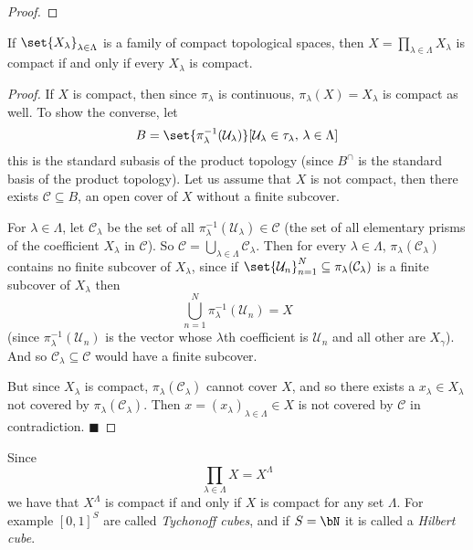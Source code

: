 \documentclass[10pt]{article}
\def\qed{\hskip1cm\penalty-100\hbox{}\hfill$\blacksquare$}
\def\mU{\mathcal{U}}
\def\mC{\mathcal{C}}
\begin{document}
\begin{proof}
\end{proof}

\begin{thrm*}

    If $\set{X_\lambda}_{\lambda\in\Lambda}$ is a family of compact topological spaces, then $X=\prod_{\lambda\in\Lambda}X_\lambda$ is compact if and only if every $X_\lambda$ is compact.

\end{thrm*}

\begin{proof}

    If $X$ is compact, then since $\pi_\lambda$ is continuous, $\pi_\lambda(X)=X_\lambda$ is compact as well.
    To show the converse, let
    \[ B = \set{\pi_\lambda^{-1}(\mU_\lambda)}[\mU_\lambda\in\tau_\lambda,\,\lambda\in\Lambda] \]
    this is the standard subasis of the product topology (since $B^\cap$ is the standard basis of the product topology).
    Let us assume that $X$ is not compact, then there exists $\mC\subseteq B$, an open cover of $X$ without a finite subcover.

    For $\lambda\in\Lambda$, let $\mC_\lambda$ be the set of all $\pi_\lambda^{-1}(\mU_\lambda)\in\mC$ (the set of all elementary prisms of the coefficient $X_\lambda$ in $\mC$).
    So $\mC=\bigcup_{\lambda\in\Lambda}\mC_\lambda$.
    Then for every $\lambda\in\Lambda$, $\pi_\lambda(\mC_\lambda)$ contains no finite subcover of $X_\lambda$, since if $\set{\mU_n}_{n=1}^N\subseteq\pi_\lambda(\mC_\lambda)$ is a finite subcover of
    $X_\lambda$ then
    \[ \bigcup_{n=1}^N\pi_\lambda^{-1}(\mU_n) = X \]
    (since $\pi_\lambda^{-1}(\mU_n)$ is the vector whose $\lambda$th coefficient is $\mU_n$ and all other are $X_\gamma$).
    And so $\mC_\lambda\subseteq\mC$ would have a finite subcover.

    But since $X_\lambda$ is compact, $\pi_\lambda(\mC_\lambda)$ cannot cover $X$, and so there exists a $x_\lambda\in X_\lambda$ not covered by $\pi_\lambda(\mC_\lambda)$.
    Then $x=(x_\lambda)_{\lambda\in\Lambda}\in X$ is not covered by $\mC$ in contradiction.
    \qed

\end{proof}

Since
\[ \prod_{\lambda\in\Lambda}X = X^\Lambda \]
we have that $X^\Lambda$ is compact if and only if $X$ is compact for any set $\Lambda$.
For example $[0,1]^S$ are called \emph{Tychonoff cubes}, and if $S=\bN$ it is called a \emph{Hilbert cube}.
\end{document}
